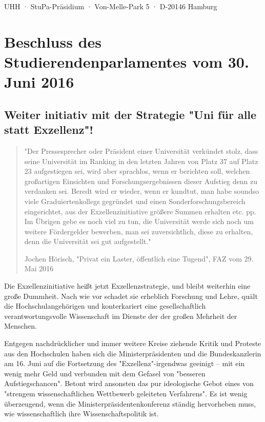 \documentclass[ngerman,headheight=70pt]{scrartcl}
\begin{document}
    UHH · StuPa-Präsidium · Von-Melle-Park 5 · D-20146 Hamburg

    \section*{Beschluss des Studierendenparlamentes vom 30. Juni 2016}
    \subsection*{Weiter initiativ mit der Strategie "Uni für alle statt Exzellenz"!}

    \blockquote[Jochen Hörisch, "Privat ein Laster, öffentlich eine Tugend",
    FAZ vom 29. Mai 2016]{"Der Pressesprecher oder Präsident einer Universität
    verkündet stolz, dass seine Universität im Ranking in den letzten Jahren von
    Platz 37 auf Platz 23 aufgestiegen sei, wird aber sprachlos, wenn er berichten
    soll, welchen großartigen Einsichten und Forschungsergebnissen dieser Aufstieg
    denn zu verdanken sei. Beredt wird er wieder, wenn er kundtut, man habe soundso
    viele Graduiertenkollegs gegründet und einen Sonderforschungsbereich eingerichtet,
    aus der Exzellenzinitiative größere Summen erhalten etc. pp. Im Übrigen gebe
    es noch viel zu tun, die Universität werde sich noch um weitere Fördergelder
    bewerben, man sei zuversichtlich, diese zu erhalten, denn die Universität sei
    gut aufgestellt."}

    Die Exzellenzinitiative heißt jetzt Exzellenzstrategie, und bleibt weiterhin
    eine große Dummheit. Nach wie vor schadet sie erheblich Forschung und Lehre,
    quält die Hochschulangehörigen und konterkariert eine gesellschaftlich
    verantwortungsvolle Wissenschaft im Dienste der der großen Mehrheit der
    Menschen.

    Entgegen nachdrücklicher und immer weitere Kreise ziehende Kritik und Proteste
    aus den Hochschulen haben sich die Ministerpräsidenten und die Bundeskanzlerin
    am 16. Juni auf die Fortsetzung des "Exzellenz"-irgendwas geeinigt -- mit ein
    wenig mehr Geld und verbunden mit dem Gefasel von "besseren Aufstiegschancen".
    Betont wird ansonsten das pur ideologische Gebot eines von "strengem
    wissenschaftlichen Wettbewerb geleiteten Verfahrens". Es ist wenig überzeugend,
    wenn die Ministerpräsidentenkonferenz ständig hervorheben muss, wie wissenschaftlich
    ihre Wissenschaftspolitik ist.
\end{document}
